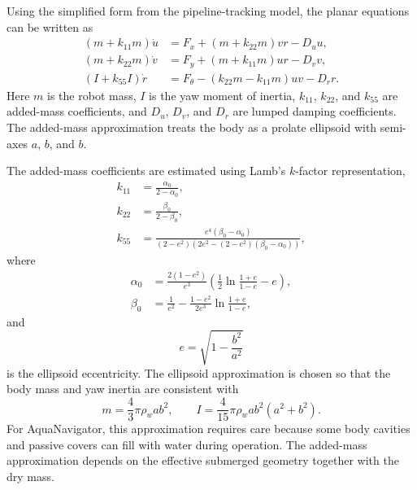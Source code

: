 \documentclass{uhcoethesis}
\begin{document}
Using the simplified form from the pipeline-tracking model, the planar equations can be written as
\begin{equation}
    \begin{aligned}
        (m+k_{11}m)\dot{u}
        &= F_x + (m+k_{22}m)vr - D_u u, \\
        (m+k_{22}m)\dot{v}
        &= F_y + (m+k_{11}m)ur - D_v v, \\
        (I+k_{55}I)\dot{r}
        &= F_{\theta} - (k_{22}m-k_{11}m)uv - D_r r .
    \end{aligned}
    \label{eq:ch2_planar_eom}
\end{equation}
Here $m$ is the robot mass, $I$ is the yaw moment of inertia, $k_{11}$, $k_{22}$, and $k_{55}$ are added-mass coefficients, and $D_u$, $D_v$, and $D_r$ are lumped damping coefficients. The added-mass approximation treats the body as a prolate ellipsoid with semi-axes $a$, $b$, and $b$.

The added-mass coefficients are estimated using Lamb's $k$-factor representation,
\begin{equation}
    \begin{aligned}
        k_{11} &= \frac{\alpha_0}{2-\alpha_0}, \\
        k_{22} &= \frac{\beta_0}{2-\beta_0}, \\
        k_{55} &=
        \frac{e^4(\beta_0-\alpha_0)}
        {(2-e^2)\left(2e^2-(2-e^2)(\beta_0-\alpha_0)\right)},
    \end{aligned}
    \label{eq:ch2_added_mass_coefficients}
\end{equation}
where
\begin{equation}
    \begin{aligned}
        \alpha_0 &=
        \frac{2(1-e^2)}{e^3}
        \left(\frac{1}{2}\ln\frac{1+e}{1-e}-e\right), \\
        \beta_0 &=
        \frac{1}{e^2}
        -\frac{1-e^2}{2e^3}\ln\frac{1+e}{1-e},
    \end{aligned}
    \label{eq:ch2_lamb_factors}
\end{equation}
and
\begin{equation}
    e = \sqrt{1-\frac{b^2}{a^2}}
    \label{eq:ch2_eccentricity}
\end{equation}
is the ellipsoid eccentricity. The ellipsoid approximation is chosen so that the body mass and yaw inertia are consistent with
\begin{equation}
    m = \frac{4}{3}\pi\rho_wab^2, \qquad
    I = \frac{4}{15}\pi\rho_wab^2(a^2+b^2).
    \label{eq:ch2_ellipsoid_mass_inertia}
\end{equation}
For AquaNavigator, this approximation requires care because some body cavities and passive covers can fill with water during operation. The added-mass approximation depends on the effective submerged geometry together with the dry mass.
\end{document}
